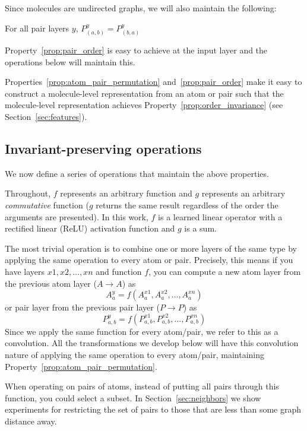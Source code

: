 Since molecules are undirected graphs, we will also maintain the following:
\begin{property}
  \label{prop:pair_order}
  For all pair layers $y$, $P^y_{(a,b)} = P^y_{(b,a)}$
\end{property}
Property~\ref{prop:pair_order} is easy to achieve at the input layer and the
operations below will maintain this.

Properties~\ref{prop:atom_pair_permutation} and~\ref{prop:pair_order} make it
easy to construct a molecule-level representation from an atom or pair such that
the molecule-level representation achieves
Property~\ref{prop:order_invariance} (see Section~\ref{sec:features}).

\subsection{Invariant-preserving operations}\label{sec:operations}

We now define a series of operations that maintain the above properties.

Throughout, $f$ represents an arbitrary function and $g$ represents an arbitrary
\emph{commutative} function ($g$ returns the same result regardless of the
order the arguments are presented). In this work, $f$ is a learned linear
operator with a rectified linear (ReLU) activation function and $g$ is a sum.

The most trivial operation is to combine one or more layers of the same type
by applying the same operation to every atom or pair. Precisely, this
means if you have layers $x1, x2, \dotsc, xn$ and function $f$, you can compute
a new atom layer from the previous atom layer ($A\rightarrow A$) as
\begin{equation}
  A^y_a = f(A^{x1}_a, A^{x2}_a, \dotsc, A^{xn}_a)
\end{equation}
or pair layer from the previous pair layer ($P\rightarrow P$) as
\begin{equation}
  P^y_{a,b} = f(P^{x1}_{a,b}, P^{x2}_{a,b}, \dotsc, P^{xn}_{a,b})
\end{equation}
Since we apply the same function for every atom/pair, we refer to this as a
convolution. All the transformations we develop below will have this convolution
nature of applying the same operation to every atom/pair, maintaining
Property~\ref{prop:atom_pair_permutation}.

When operating on pairs of atoms, instead of putting all pairs through
this function, you could select a subset. In
Section~\ref{sec:neighbors} we show experiments for restricting the
set of pairs to those that are less than some graph distance away.

